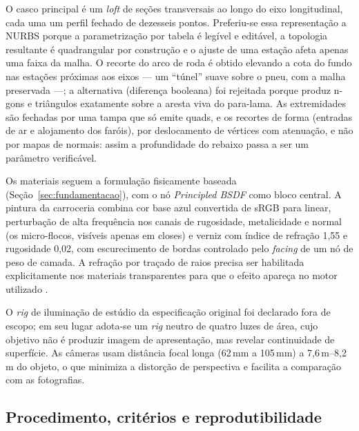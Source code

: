 O casco principal \'e um \emph{loft} de se\c{c}\~oes transversais ao longo do eixo
longitudinal, cada uma um perfil fechado de dezesseis pontos. Preferiu-se essa
representa\c{c}\~ao a NURBS \cite{piegl1997} porque a parametriza\c{c}\~ao por tabela
\'e leg\'ivel e edit\'avel, a topologia resultante \'e quadrangular por
constru\c{c}\~ao e o ajuste de uma esta\c{c}\~ao afeta apenas uma faixa da malha. O
recorte do arco de roda \'e obtido elevando a cota do fundo nas esta\c{c}\~oes
pr\'oximas aos eixos --- um ``t\'unel'' suave sobre o pneu, com a malha preservada ---; a
alternativa (diferen\c{c}a booleana) foi rejeitada porque produz n-gons e tri\^angulos
exatamente sobre a aresta viva do para-lama. As extremidades s\~ao fechadas por uma tampa
que s\'o emite quads, e os recortes de forma (entradas de ar e alojamento dos far\'ois),
por deslocamento de v\'ertices com atenua\c{c}\~ao, e n\~ao por mapas de normais: assim a
profundidade do rebaixo passa a ser um par\^ametro verific\'avel.

Os materiais seguem a formula\c{c}\~ao fisicamente baseada
(Se\c{c}\~ao~\ref{sec:fundamentacao}), com o n\'o \emph{Principled BSDF} como bloco
central. A pintura da carroceria combina cor base azul convertida de sRGB para linear,
perturba\c{c}\~ao de alta frequ\^encia nos canais de rugosidade, metalicidade e normal (os
micro-flocos, vis\'iveis apenas em closes) e verniz com \'indice de refra\c{c}\~ao 1,55 e
rugosidade 0,02, com escurecimento de bordas controlado pelo \emph{facing} de um n\'o de
peso de camada. A refra\c{c}\~ao por tra\c{c}ado de raios precisa ser habilitada
explicitamente nos materiais transparentes para que o efeito apare\c{c}a no motor
utilizado \cite{blender5manual, walter2007}.

O \emph{rig} de ilumina\c{c}\~ao de est\'udio da especifica\c{c}\~ao original foi
declarado fora de escopo; em seu lugar adota-se um \emph{rig} neutro de quatro luzes de
\'area, cujo objetivo n\~ao \'e produzir imagem de apresenta\c{c}\~ao, mas revelar
continuidade de superf\'icie. As c\^ameras usam dist\^ancia focal longa (62\,mm a
105\,mm) a 7,6\,m--8,2\,m do objeto, o que minimiza a distor\c{c}\~ao de perspectiva e
facilita a compara\c{c}\~ao com as fotografias.

\subsection{Procedimento, crit\'erios e reprodutibilidade}


